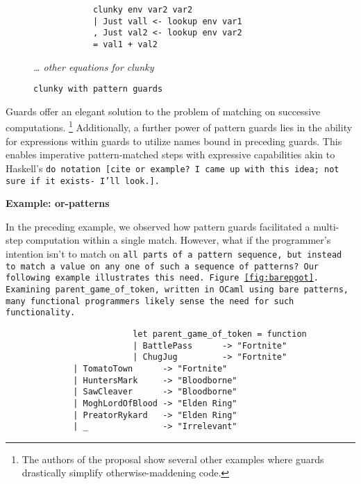 \documentclass[manuscript,screen,review, 12pt]{acmart}
\begin{document}
\begin{outline}[enumerate]
    \begin{figure}[hbt!]  
        \begin{center}
        \begin{verbatim}
            clunky env var2 var2    
            | Just vall <- lookup env var1
            , Just val2 <- lookup env var2
            = val1 + val2
        \end{verbatim}
        \it{… other equations for clunky}
        \end{center}    
    
    \caption{\tt{clunky} with pattern guards} 
    \label{fig:guardclunky}
    \end{figure}

    Guards offer an elegant solution to the problem of matching on successive
    computations. \footnote{The authors of the proposal show several other
    examples where guards drastically simplify otherwise-maddening code.}
    Additionally, a further power of pattern guards lies in the ability for
    expressions within guards to utilize names bound in preceding guards. This
    enables imperative pattern-matched steps with expressive capabilities akin
    to Haskell's \tt{do} notation [cite or example? I came up with this idea;
    not sure if it exists- I'll look.]. 

         \bf{Example: or-patterns}

        In the preceding example, we observed how pattern guards facilitated a
        multi-step computation within a single match. However, what if the
        programmer's intention isn't to match on \tt{all} parts of a pattern
        sequence, but instead to match a value on \tt{any one} of such a
        sequence of patterns? Our following example illustrates this need.
        Figure~\ref{fig:barepgot}. Examining \tt{parent\_game\_of\_token},
        written in OCaml using bare patterns, many functional programmers likely
        sense the need for such functionality.
        
        
        \begin{figure}
            \begin{center}
                \begin{verbatim}
                    let parent_game_of_token = function 
                    | BattlePass      -> "Fortnite"
                    | ChugJug         -> "Fortnite"
        | TomatoTown      -> "Fortnite"
        | HuntersMark     -> "Bloodborne"
        | SawCleaver      -> "Bloodborne"
        | MoghLordOfBlood -> "Elden Ring"
        | PreatorRykard   -> "Elden Ring"
        | _               -> "Irrelevant"
                \end{verbatim}
            \end{center}    


\end{figure}
\end{outline}
\end{document}
